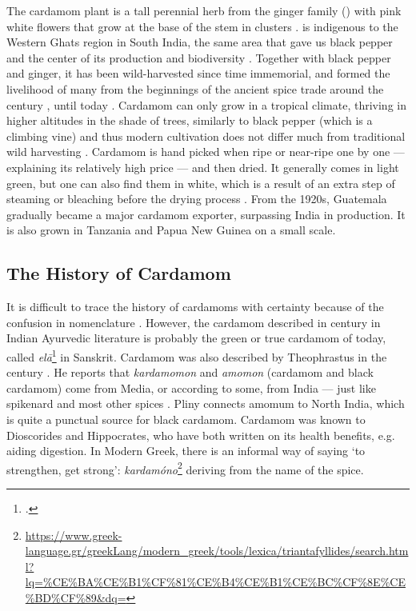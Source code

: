 The cardamom plant is a tall perennial herb from the ginger family () with pink white flowers that grow at the base of the stem in clusters \autocite[132]{van_wyk_culinary_2014}.  is indigenous to the Western Ghats region in South India, the same area that gave us black pepper and the center of its production and biodiversity \autocite[1]{ravindran_cardamom_2002}. Together with black pepper and ginger, it has been wild-harvested since time immemorial, and formed the livelihood of many from the beginnings of the ancient spice trade around the  century \BC{}, until today \autocite[132]{van_wyk_culinary_2014}. Cardamom can only grow in a tropical climate, thriving in higher altitudes in the shade of trees, similarly to black pepper (which is a climbing vine) and thus modern cultivation does not differ much from traditional wild harvesting \autocite[132]{van_wyk_culinary_2014}. Cardamom is hand picked when ripe or near-ripe one by one --- explaining its relatively high price --- and then dried. It generally comes in light green, but one can also find them in white, which is a result of an extra step of steaming or bleaching before the drying process \autocite[132]{van_wyk_culinary_2014}. From the 1920s, Guatemala gradually became a major cardamom exporter, surpassing India in production. It is also grown in Tanzania and Papua New Guinea on a small scale.

\subsection{The History of Cardamom}

It is difficult to trace the history of cardamoms with certainty because of the confusion in nomenclature \autocite{cumo_encyclopedia_2013}. However, the cardamom described in  century \BC{} in Indian Ayurvedic literature is probably the green or true cardamom of today, called \textit{el\={a}}\footcite[232]{monier-williams_sanskrit-english_1899} in Sanskrit. Cardamom was also described by Theophrastus in the  century \BC{}. He reports that \textit{kardamomon} and \textit{amomon} (cardamom and black cardamom) come from Media, or according to some, from India --- just like spikenard and most other spices \autocite[249]{theophrastus_enquiry_1916}. Pliny connects amomum to North India, which is quite a punctual source for black cardamom. Cardamom was known to Dioscorides and Hippocrates, who have both written on its health benefits, e.g. aiding digestion. In Modern Greek, there is an informal way of saying `to strengthen, get strong':  \textit{kardamóno}\footnote{\url{https://www.greek-language.gr/greekLang/modern_greek/tools/lexica/triantafyllides/search.html?lq=\%CE\%BA\%CE\%B1\%CF\%81\%CE\%B4\%CE\%B1\%CE\%BC\%CF\%8E\%CE\%BD\%CF\%89\&dq=}} deriving from the name of the spice.

